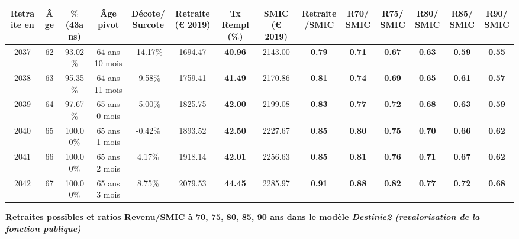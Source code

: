 \begin{adjustbox}{max width=\textwidth} 
\begin{tabular}[htb]{|c|c||c|c|c||c|c||c|c||c|c|c|c|c|} 
\hline 
 Retraite en &  Âge &  \%(43ans) &  Âge pivot &  Décote/Surcote &  Retraite (\euro{} 2019) &  Tx Rempl(\%) &  SMIC (\euro{} 2019) &  Retraite/SMIC &  R70/SMIC &  R75/SMIC &  R80/SMIC &  R85/SMIC &  R90/SMIC \\ 
\hline \hline 
 2037 &  62 &  93.02\% &  64 ans 10 mois &  -14.17\% &  1694.47 &  {\bf 40.96} &  2143.00 &  {\bf {\color{red} 0.79}} &  {\bf {\color{red} 0.71}} &  {\bf {\color{red} 0.67}} &  {\bf {\color{red} 0.63}} &  {\bf {\color{red} 0.59}} &  {\bf {\color{red} 0.55}} \\ 
\hline 
 2038 &  63 &  95.35\% &  64 ans 11 mois &  -9.58\% &  1759.41 &  {\bf 41.49} &  2170.86 &  {\bf {\color{red} 0.81}} &  {\bf {\color{red} 0.74}} &  {\bf {\color{red} 0.69}} &  {\bf {\color{red} 0.65}} &  {\bf {\color{red} 0.61}} &  {\bf {\color{red} 0.57}} \\ 
\hline 
 2039 &  64 &  97.67\% &  65 ans 0 mois &  -5.00\% &  1825.75 &  {\bf 42.00} &  2199.08 &  {\bf {\color{red} 0.83}} &  {\bf {\color{red} 0.77}} &  {\bf {\color{red} 0.72}} &  {\bf {\color{red} 0.68}} &  {\bf {\color{red} 0.63}} &  {\bf {\color{red} 0.59}} \\ 
\hline 
 2040 &  65 &  100.00\% &  65 ans 1 mois &  -0.42\% &  1893.52 &  {\bf 42.50} &  2227.67 &  {\bf {\color{red} 0.85}} &  {\bf {\color{red} 0.80}} &  {\bf {\color{red} 0.75}} &  {\bf {\color{red} 0.70}} &  {\bf {\color{red} 0.66}} &  {\bf {\color{red} 0.62}} \\ 
\hline 
 2041 &  66 &  100.00\% &  65 ans 2 mois &  4.17\% &  1918.14 &  {\bf 42.01} &  2256.63 &  {\bf {\color{red} 0.85}} &  {\bf {\color{red} 0.81}} &  {\bf {\color{red} 0.76}} &  {\bf {\color{red} 0.71}} &  {\bf {\color{red} 0.67}} &  {\bf {\color{red} 0.62}} \\ 
\hline 
 2042 &  67 &  100.00\% &  65 ans 3 mois &  8.75\% &  2079.53 &  {\bf 44.45} &  2285.97 &  {\bf {\color{red} 0.91}} &  {\bf {\color{red} 0.88}} &  {\bf {\color{red} 0.82}} &  {\bf {\color{red} 0.77}} &  {\bf {\color{red} 0.72}} &  {\bf {\color{red} 0.68}} \\ 
\hline 
\hline 
\end{tabular} 
\end{adjustbox} 
 
 \vspace{0.1cm} 
{\bf \noindent Retraites possibles et ratios Revenu/SMIC à 70, 75, 80, 85, 90 ans dans le modèle \emph{Destinie2 (revalorisation de la fonction publique)}}  
 
